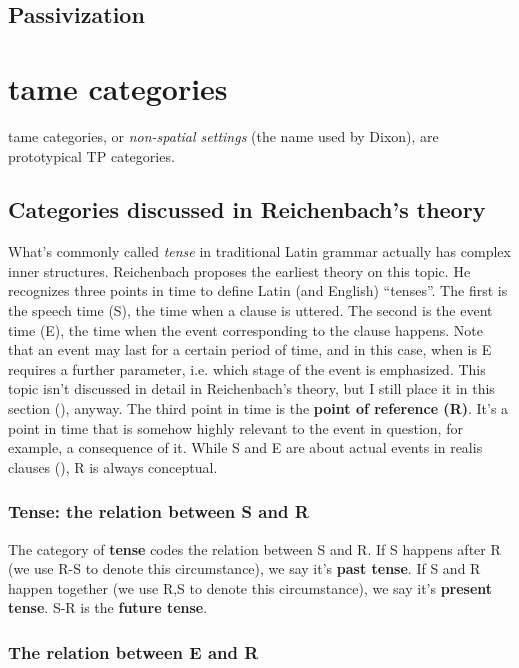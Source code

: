 \documentclass[UTF8, a4paper, oneside, scheme=plain]{ctexart}
\newcommand*{\concept}[1]{\textbf{#1}}
\newcommand*{\term}[1]{\emph{#1}}
\begin{document}
\subsection{Passivization}

\section{\ac{tame} categories}

\ac{tame} categories, or \term{non-spatial settings} (the name used by Dixon),
are prototypical TP categories.

\subsection{Categories discussed in Reichenbach's theory}

What's commonly called \term{tense} in traditional Latin grammar actually has complex inner structures.
Reichenbach proposes the earliest theory on this topic.
He recognizes three points in time to define Latin (and English) ``tenses''.
The first is the speech time (S), 
the time when a clause is uttered.
The second is the event time (E),
the time when the event corresponding to the clause happens.
Note that an event may last for a certain period of time,
and in this case, 
when is E requires a further parameter,
i.e. which stage of the event is emphasized.
This topic isn't discussed in detail in Reichenbach's theory,
but I still place it in this section (), anyway.
The third point in time is the \concept{point of reference (R)}.
It's a point in time that is somehow highly relevant to the event in question,
for example, a consequence of it.
While S and E are about actual events in realis clauses (),
R is always conceptual.

\subsubsection{Tense: the relation between S and R}

The category of \concept{tense} codes the relation between S and R.
If S happens after R (we use R-S to denote this circumstance),
we say it's \concept{past tense}.
If S and R happen together (we use R,S to denote this circumstance),
we say it's \concept{present tense}.
S-R is the \concept{future tense}.

\subsubsection{The relation between E and R}\label{sec:completion}
\end{document}
